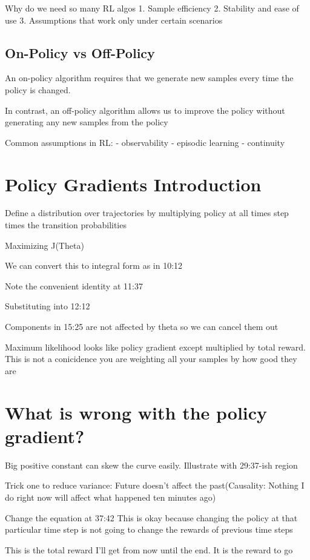 \documentclass{article}
\begin{document}
Why do we need so many RL algos
1. Sample efficiency
2. Stability and ease of use
3. Assumptions that work only under certain scenarios

\subsection{On-Policy vs Off-Policy}
An on-policy algorithm requires that we generate new samples every time the policy is changed.

In contrast, an off-policy algorithm allows us to improve the policy without generating any new samples from the policy

Common assumptions in RL:
- observability
- episodic learning
- continuity



\section{Policy Gradients Introduction}
Define a distribution over trajectories by multiplying policy at all times step times the transition probabilities

Maximizing J(Theta)

We can convert this to integral form as in 10:12

Note the convenient identity at 11:37

Substituting into 12:12

Components in 15:25 are not affected by theta so we can cancel them out

Maximum likelihood looks like policy gradient except multiplied by total reward. This is not a conicidence you are weighting all your samples by how good they are 

\section{What is wrong with the policy gradient?}
Big positive constant can skew the curve easily. Illustrate with 29:37-ish region


Trick one to reduce variance: Future doesn't affect the past(Causality: Nothing I do right now will affect what happened ten minutes ago)

Change the equation at 37:42
This is okay because changing the policy at that particular time step is not going to change the rewards of previous time steps

This is the total reward I'll get from now until the end. It is the reward to go
\end{document}
